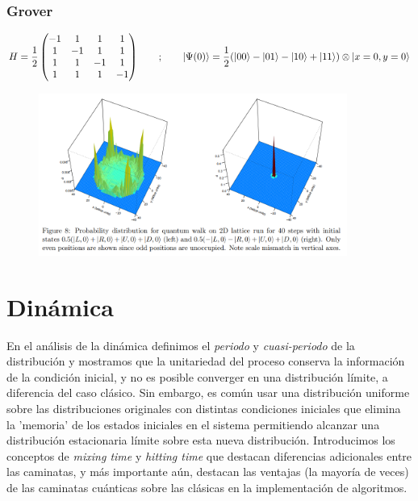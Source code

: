 \subsubsection*{Grover}
\begin{equation}
H=\frac{1}{2}
\begin{pmatrix}
-1 & 1 & 1 & 1\\
1 & -1 & 1 & 1\\
1 & 1 & -1 & 1\\
1 & 1 & 1 & -1
\end{pmatrix}
\qquad ; \qquad    \ket{\Psi(0)}=\frac{1}{2}(\ket{00}-\ket{01}-\ket{10}+\ket{11})\otimes\ket{x=0,y=0}
\end{equation}{}

\begin{figure}[ht]
\caption{}
\centering
\includegraphics[width=0.9\textwidth]{Kap4/QWGroverCoinKendonPercolation2019.png}
\end{figure}

\section{Dinámica}
En el análisis de la dinámica definimos el \textit{periodo} y \textit{cuasi-periodo} de la distribución y mostramos que la unitariedad del proceso conserva la información de la condición inicial, y no es posible converger en una distribución límite, a diferencia del caso clásico. Sin embargo, es común usar una distribución uniforme sobre las distribuciones originales con distintas condiciones iniciales que elimina la 'memoria' de los estados iniciales en el sistema permitiendo alcanzar una distribución estacionaria límite sobre esta nueva distribución. Introducimos los conceptos de \textit{mixing time} y \textit{hitting time} que destacan diferencias adicionales entre las caminatas, y más importante aún, destacan las ventajas (la mayoría de veces) de las caminatas cuánticas sobre las clásicas en la implementación de algoritmos.\\

